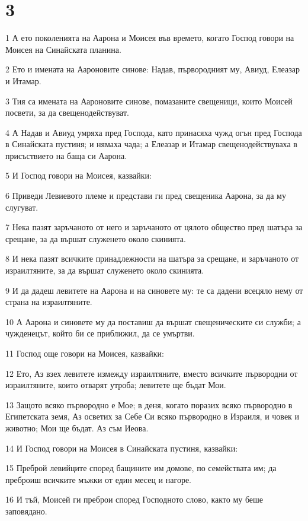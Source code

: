 \chapter{3}

\par 1 А ето поколенията на Аарона и Моисея във времето, когато Господ говори на Моисея на Синайската планина.
\par 2 Ето и имената на Аароновите синове: Надав, първородният му, Авиуд, Елеазар и Итамар.
\par 3 Тия са имената на Аароновите синове, помазаните свещеници, които Моисей посвети, за да свещенодействуват.
\par 4 А Надав и Авиуд умряха пред Господа, като принасяха чужд огън пред Господа в Синайската пустиня; и нямаха чада; а Елеазар и Итамар свещенодействуваха в присъствието на баща си Аарона.
\par 5 И Господ говори на Моисея, казвайки:
\par 6 Приведи Левиевото племе и представи ги пред свещеника Аарона, за да му слугуват.
\par 7 Нека пазят заръчаното от него и заръчаното от цялото общество пред шатъра за срещане, за да вършат служенето около скинията.
\par 8 И нека пазят всичките принадлежности на шатъра за срещане, и заръчаното от израилтяните, за да вършат служенето около скинията.
\par 9 И да дадеш левитете на Аарона и на синовете му: те са дадени всецяло нему от страна на израилтяните.
\par 10 А Аарона и синовете му да поставиш да вършат свещеническите си служби; а чужденецът, който би се приближил, да се умъртви.
\par 11 Господ още говори на Моисея, казвайки:
\par 12 Ето, Аз взех левитете измежду израилтяните, вместо всичките първородни от израилтяните, които отварят утроба; левитете ще бъдат Мои.
\par 13 Защото всяко първородно е Мое; в деня, когато поразих всяко първородно в Египетската земя, Аз осветих за Себе Си всяко първородно в Израиля, и човек и животно; Мои ще бъдат. Аз съм Иеова.
\par 14 И Господ говори на Моисея в Синайската пустиня, казвайки:
\par 15 Преброй левийците според бащините им домове, по семействата им; да преброиш всичките мъжки от един месец и нагоре.
\par 16 И тъй, Моисей ги преброи според Господното слово, както му беше заповядано.
